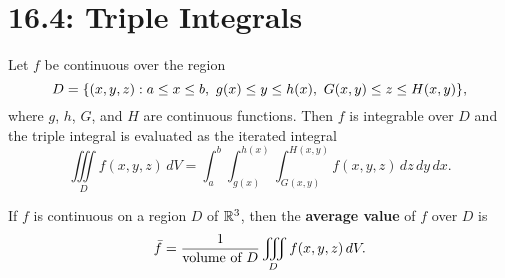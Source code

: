 \documentclass[mathNotesPreamble]{subfiles}
\begin{document}
\section{16.4: Triple Integrals}

  \begin{thmBox*}
    Let $f$ be continuous over the region
      \[D={\left\{(x,y,z): a\leq x\leq b,\ g(x)\leq y\leq h(x),\ G(x,y)\leq z\leq H(x,y)\right\}},\]
    where $g$, $h$, $G$, and $H$ are continuous functions. Then $f$ is integrable over $D$ and the triple integral is evaluated as the iterated integral
      \[\iiint\limits_D f(x,y,z)\,dV=\int_a^b \int_{g(x)}^{h(x)} \int_{G(x,y)}^{H(x,y)} f(x,y,z)\,dz\,dy\,dx.\]
  \end{thmBox*}

  \begin{defn*}
    If $f$ is continuous on a region $D$ of $\mathbb{R}^3$, then the \textbf{average value} of $f$ over $D$ is
      \[\bar{f}=\frac{1}{\textnormal{volume of }D}\iiint\limits_D f(x,y,z)\,dV.\]
  \end{defn*}


  \pagebreak
  
\end{document}

